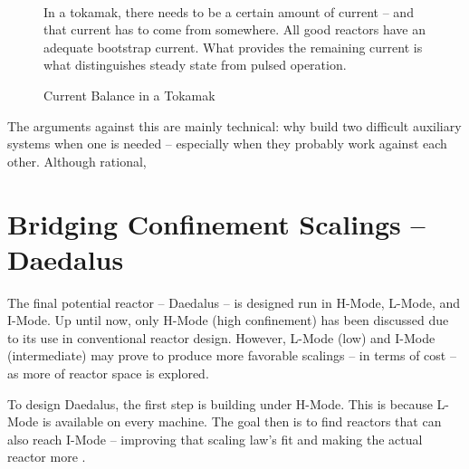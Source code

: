 \begin{figure}
	\centering
	\begin{adjustbox}{width=0.75\textwidth}
		
	\end{adjustbox}
	\caption{Current Balance in a Tokamak} ~\\
	\small In a tokamak, there needs to be a certain amount of current -- and that current has to come from somewhere. All good reactors have an adequate bootstrap current. What provides the remaining current is what distinguishes steady state from pulsed operation.
	\label{fig:cur_balance_final}
\end{figure}

The arguments against this are mainly technical: why build two difficult auxiliary systems when one is needed -- especially when they probably work against each other. Although rational, 

\section{Bridging Confinement Scalings -- Daedalus}

The final potential reactor -- Daedalus -- is designed  run in H-Mode, L-Mode, and I-Mode. Up until now, only H-Mode (high confinement) has been discussed due to its use in conventional reactor design. However, L-Mode (low) and I-Mode\cite{imode} (intermediate) may prove to produce more favorable scalings -- in terms of cost -- as more of reactor space is explored.

To design Daedalus, the first step is  building under H-Mode. This is because L-Mode is available on every machine. The goal then is to find reactors that can also reach I-Mode --  improving that scaling law's fit and  making the actual reactor more .


